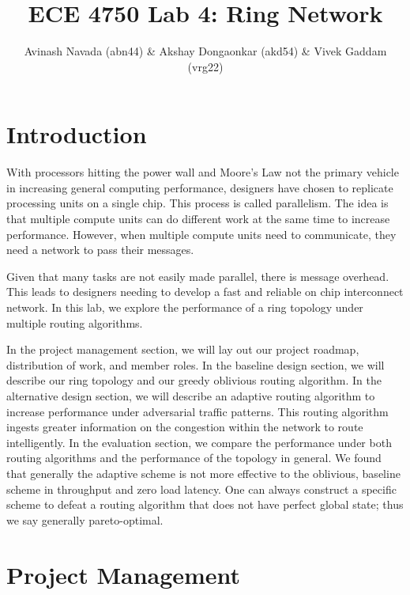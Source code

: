 \documentclass[10pt]{article}
\begin{document}
\title{ECE 4750 Lab 4: Ring Network}
\author{Avinash Navada (abn44) \& Akshay Dongaonkar (akd54) 
		\& Vivek Gaddam (vrg22)}
\maketitle


\section{Introduction}

With processors hitting the power wall and Moore's Law not the primary vehicle
in increasing general computing performance, designers have chosen to
replicate processing units on a single chip. 
This process is called parallelism. 
The idea is that multiple compute units can do different work at the same time
to increase performance.
However, when multiple compute units need to communicate, they need a network
to pass their messages. \par

Given that many tasks are not easily made parallel, there is message overhead.
This leads to designers needing to develop a fast and reliable
on chip interconnect network.
In this lab, we explore the performance of a ring topology under multiple
routing algorithms. \par

In the project management section, we will lay out our project roadmap,
distribution of work, and member roles.
In the baseline design section, we will describe our ring topology and our 
greedy oblivious routing algorithm.
In the alternative design section, we will describe an adaptive routing 
algorithm to increase performance under adversarial traffic patterns.
This routing algorithm ingests greater information on the congestion within
the network to route intelligently.
In the evaluation section, we compare the performance under both routing
algorithms and the performance of the topology in general. 
We found that generally the adaptive scheme is not more effective to the 
oblivious, baseline scheme in throughput and zero load latency. 
One can always construct a specific scheme to defeat a routing algorithm that
does not have perfect global state; thus we say generally pareto-optimal.


\section{Project Management}
\end{document}
